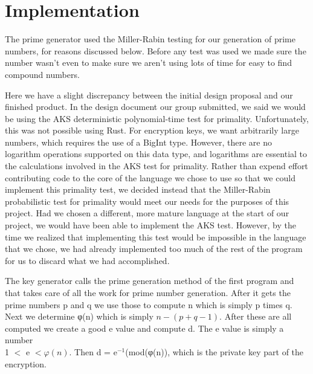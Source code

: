 \documentclass[12pt,technote]{IEEEtran}
\begin{document}
\section{Implementation}
The prime generator used the Miller-Rabin testing for our generation of prime
numbers, for reasons discussed below. Before any test was used we made sure the
number wasn't even to make sure we aren't using lots of time for easy to find 
compound numbers.
\par Here we have a slight discrepancy between the initial design proposal and
our finished product. In the design document our group submitted, we said we
would be using the AKS deterministic polynomial-time test for primality.
Unfortunately, this was not possible using Rust. For encryption keys, we want
arbitrarily large numbers, which requires the use of a BigInt type.
However, there are no logarithm operations supported on this data type,
and logarithms are essential to the calculations involved in the AKS test for
primality. Rather than expend effort contributing code to the core of the
language we chose to use so that we could implement this primality test, we
decided instead that the Miller-Rabin probabilistic test for primality would
meet our needs for the purposes of this project. Had we chosen a different, more
mature language at the start of our project, we would have been able to
implement the AKS test. However, by the time we realized that implementing this
test would be impossible in the language that we chose, we had already
implemented too much of the rest of the program for us to discard what we had
accomplished.
\par The key generator calls the prime generation method of the first program 
and that takes care of all the work for prime number generation. After it gets 
the prime numbers p and q we use those to compute n which is simply p times q. 
Next we determine φ(n) which is simply $n - (p + q -1)$. After these are all 
computed we create a good e value and compute d. The e value is simply a number 
\\1 $<$ e $<φ(n)$. Then d = e$^{-1}$(mod(φ(n)), which is the private key part of 
the encryption.
\end{document}
